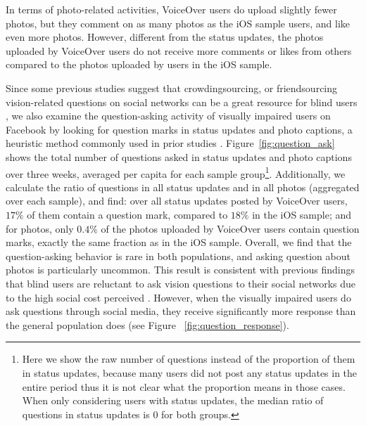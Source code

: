 \documentclass{sigchi}
\begin{document}
In terms of photo-related activities, VoiceOver users do upload slightly fewer photos, but they comment on as many photos as the iOS sample users, and like even more photos. However, different from the status updates, the photos uploaded by VoiceOver users do not receive more comments or likes from others compared to the photos uploaded by users in the iOS sample.

Since some previous studies suggest that crowdingsourcing, or friendsourcing vision-related questions on social networks can be a great resource for blind users \cite{brady2013cscw, brady2013chi}, we also examine the question-asking activity of visually impaired users on Facebook by looking for question marks in status updates and photo captions, a heuristic method commonly used in prior studies \cite{morris2014,paul2011}. Figure~\ref{fig:question_ask} shows the total number of questions asked in status updates and photo captions over three weeks, averaged per capita for each sample group\footnote{Here we show the raw number of questions instead of the proportion of them in status updates, because many users did not post any status updates in the entire period thus it is not clear what the proportion means in those cases. When only considering users with status updates, the median ratio of questions in status updates is $0$ for both groups.}.  Additionally, we calculate the ratio of questions in all status updates and in all photos (aggregated over each sample), and find: over all status updates posted by VoiceOver users, $17\%$ of them contain a question mark, compared to $18\%$ in the iOS sample; and for photos, only $0.4\%$ of the photos uploaded by VoiceOver users contain question marks, exactly the same fraction as in the iOS sample. Overall, we find that the question-asking behavior is rare in both populations, and asking question about photos is particularly uncommon. This result is consistent with previous findings that blind users are reluctant to ask vision questions to their social networks due to the high social cost perceived \cite{brady2013cscw}. However, when the visually impaired users do ask questions through social media, they receive significantly more response than the general population does (see Figure ~\ref{fig:question_response}). 

\end{document}

